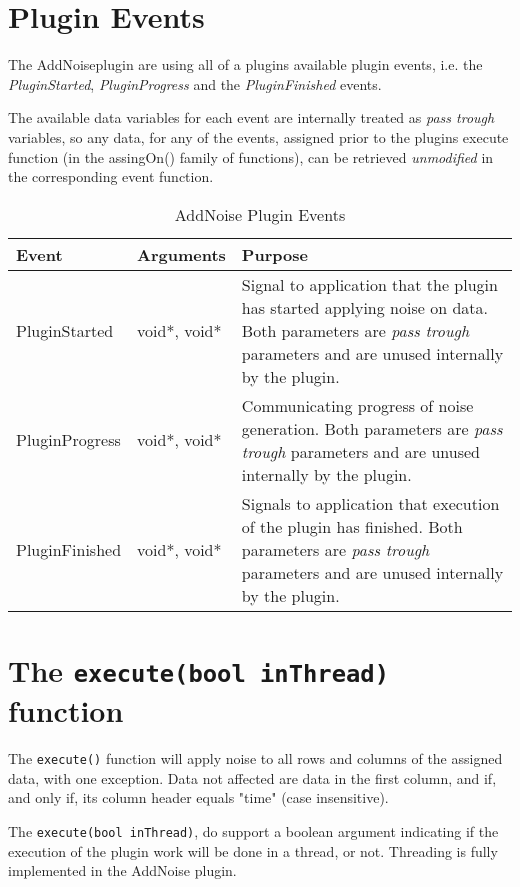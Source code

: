 \section{Plugin Events}
The AddNoiseplugin are using all of a plugins available plugin events, i.e. the \emph{PluginStarted}, \emph{PluginProgress} and the \emph{PluginFinished} events.

The available data variables for each event are internally treated as \emph{pass trough} variables, so any data, for any of the events, assigned prior to 
the plugins execute function (in the assingOn() family of functions), can be retrieved \emph{unmodified} in the corresponding event function.
\begin{table}[ht]
\centering %
\begin{tabular}{l l p{7.5cm}} %

Event & Arguments & Purpose \\ [0.5ex] %
\hline %
\hline %
PluginStarted  	& 	void*, void*  & Signal to application that the plugin has started applying noise on data. Both parameters are \emph{pass trough} parameters and are unused internally by the plugin.\\[0.5ex]
PluginProgress	& 	void*, void*  & Communicating progress of noise generation. Both parameters are \emph{pass trough} parameters and are unused internally by the plugin. \\[0.5ex]
PluginFinished	& 	void*, void*  & Signals to application that execution of the plugin has finished. Both parameters are \emph{pass trough} parameters and are unused internally by the plugin.\\

\hline %
\end{tabular}
\caption{AddNoise Plugin Events} 
\label{table:AddNoisePluginEvents} 
\end{table}

\section{The \texttt{execute(bool inThread)} function}
The \verb|execute()| function will apply noise to all rows and columns of the assigned data, with one exception. Data not affected are data in the first column, and if, and only if, its column header equals "time" (case insensitive). 

The \verb|execute(bool inThread)|, do support a boolean argument indicating if the execution of the plugin work will be done in a thread, or not. Threading is fully implemented in the AddNoise plugin.

